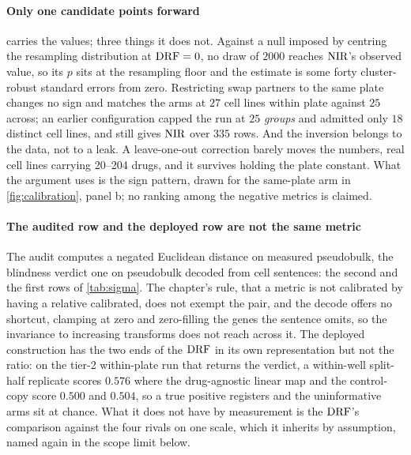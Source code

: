 \paragraph{Only one candidate points forward}  carries the values;
three things it does not. Against a null imposed by centring the resampling
distribution at $\textrm{DRF} = 0$, no draw of $\num{2000}$ reaches $\textrm{NIR}$'s observed
value, so its $p$ sits at the resampling floor and the estimate is some forty
cluster-robust standard errors from zero. Restricting swap partners to the same
plate changes no sign and matches the arms at $27$ cell lines within plate
against $25$ across; an earlier configuration capped the run at $25$
\emph{groups} and admitted only $18$ distinct cell lines, and still gives $\textrm{NIR}$
 over $335$ rows. And the inversion belongs to the
data, not to a leak. A leave-one-out correction barely moves the numbers, real
cell lines carrying 20--204 drugs, and it survives holding the plate constant.
What the argument uses is the sign pattern, drawn for the same-plate arm in
\cref{fig:calibration}, panel b; no ranking among the negative metrics is
claimed.

\paragraph{The audited row and the deployed row are not the same metric} The
audit computes a negated Euclidean distance on measured pseudobulk, the
blindness verdict one on pseudobulk decoded from cell sentences: the second and
the first rows of \cref{tab:sigma}. The chapter's rule, that a metric is not
calibrated by having a relative calibrated, does not exempt the pair, and the
decode offers no shortcut, clamping at zero and zero-filling the genes the
sentence omits, so the invariance to increasing transforms does not reach across
it. The deployed construction has the two ends of the $\textrm{DRF}$ in its own
representation but not the ratio: on the tier-2 within-plate run that returns
the verdict, a within-well split-half replicate scores $0.576$ where the
drug-agnostic linear map and the control-copy score $0.500$ and $0.504$, so a
true positive registers and the uninformative arms sit at chance. What it does
not have by measurement is the $\textrm{DRF}$'s comparison against the four rivals on
one scale, which it inherits by assumption, named again in the scope limit
below.

